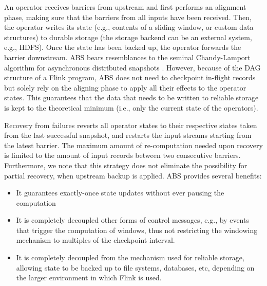 An operator receives barriers from upstream and first performs an alignment phase, making sure that the barriers from all inputs have been received. Then, the operator writes its state (e.g., contents of a sliding window, or custom data structures) to durable storage (the storage backend can be an external system, e.g., HDFS). Once the state has been backed up, the operator forwards the barrier downstream. ABS bears resemblances to the seminal Chandy-Lamport algorithm for asynchronous distributed snapshots \cite{chandy1985distributed}. However, because of the DAG structure of a Flink program, ABS does not need to checkpoint in-flight records but solely rely on the aligning phase to apply all their effects to the operator states. This guarantees that the data that needs to be written to reliable storage is kept to the theoretical minimum (i.e., only the current state of the operators).

Recovery from failures reverts all operator states to their respective states taken from the last successful snapshot, and restarts the input streams starting from the latest barrier. The maximum amount of re-computation needed upon recovery is limited to the amount of input records between two consecutive barriers. Furthermore,  we note that this strategy does not eliminate the possibility for partial recovery, when upstream backup is applied.
\vspace{1mm}
\noindent ABS provides several benefits:\vspace{-3mm}
\begin{itemize}
\item It guarantees exactly-once state updates without ever pausing the computation \vspace{-3mm}
\item It is completely decoupled other forms of control messages, e.g., by events that trigger the computation of windows, thus not restricting the windowing mechanism to multiples of the checkpoint interval. \vspace{-3mm}
\item It is completely decoupled from the mechanism used for reliable storage, allowing state to be backed up to file systems, databases, etc, depending on the larger environment in which Flink is used.
\end{itemize}




































